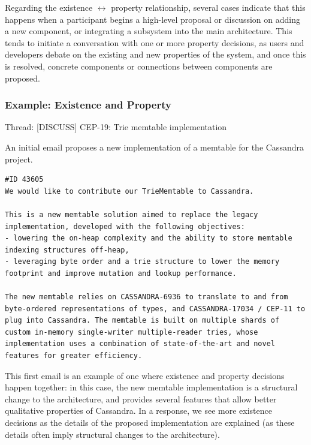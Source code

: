 \documentclass[a4paper, 12pt]{article}
\begin{document}
		Regarding the existence $ \leftrightarrow $ property relationship, several cases indicate that this happens when a participant begins a high-level proposal or discussion on adding a new component, or integrating a subsystem into the main architecture. This tends to initiate a conversation with one or more property decisions, as users and developers debate on the existing and new properties of the system, and once this is resolved, concrete components or connections between components are proposed.
		
		\subsubsection{Example: Existence and Property}
			\footnotesize
				Thread: [DISCUSS] CEP-19: Trie memtable implementation
			\normalsize
			
			An initial email proposes a new implementation of a memtable for the Cassandra project.
			
			\begin{verbatim}
#ID 43605
We would like to contribute our TrieMemtable to Cassandra.

This is a new memtable solution aimed to replace the legacy implementation, developed with the following objectives:
- lowering the on-heap complexity and the ability to store memtable indexing structures off-heap,
- leveraging byte order and a trie structure to lower the memory footprint and improve mutation and lookup performance.

The new memtable relies on CASSANDRA-6936 to translate to and from byte-ordered representations of types, and CASSANDRA-17034 / CEP-11 to plug into Cassandra. The memtable is built on multiple shards of custom in-memory single-writer multiple-reader tries, whose implementation uses a combination of state-of-the-art and novel features for greater efficiency.
			\end{verbatim}
		
			This first email is an example of one where existence and property decisions happen together: in this case, the new memtable implementation is a structural change to the architecture, and provides several features that allow better qualitative properties of Cassandra. In a response, we see more existence decisions as the details of the proposed implementation are explained (as these details often imply structural changes to the architecture).
			
\end{document}
